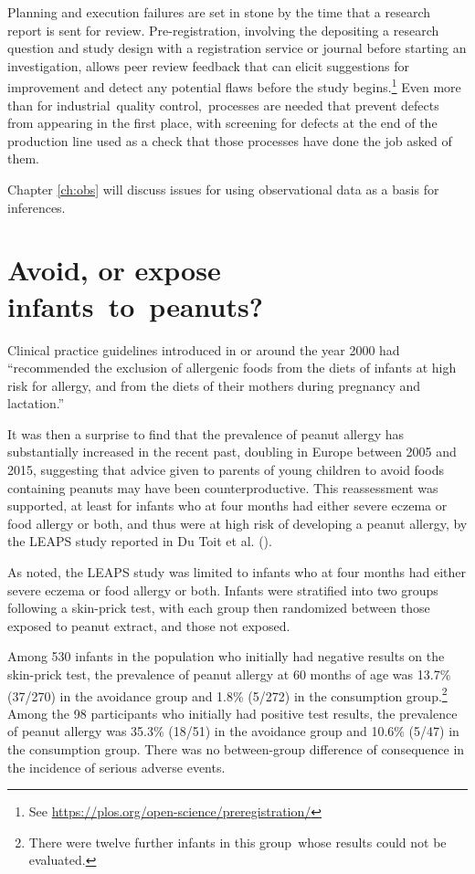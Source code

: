 \documentclass[
  10ptls,
  b5paper]{book}
\begin{document}
Planning and execution failures are set in stone by the time that a research report is sent for review. Pre-registration, involving the depositing a research question and study design with a registration service or journal before starting an investigation, allows peer review feedback that can elicit suggestions for improvement and detect any potential flaws before the study begins.\footnote{See \url{https://plos.org/open-science/preregistration/}} Even more than for industrial~quality control,~processes are needed that prevent defects from appearing in the first place, with screening for defects at the end of the production line used as a check that those processes have done the job asked of them.

Chapter \ref{ch:obs} will discuss issues for using observational data as a basis for inferences.

\section{Avoid, or expose infants~to~peanuts?}\label{avoid-or-expose-infants-to-peanuts}

Clinical practice guidelines introduced in or around the year 2000 had ``recommended the exclusion of allergenic foods from the diets of infants at high risk for allergy, and from the diets of their mothers during pregnancy and lactation.''

It was then a surprise to find that the prevalence of peanut allergy has substantially increased in the recent past, doubling in Europe between 2005 and 2015, suggesting that advice given to parents of young children to avoid foods containing peanuts may have been counterproductive. This reassessment was supported, at least for infants who at four months had either severe eczema or food allergy or both, and thus were at high risk of developing a peanut allergy, by the LEAPS study reported in Du Toit et al. ().

As noted, the LEAPS study was limited to infants who at four months had either severe eczema or food allergy or both. Infants were stratified into two groups following a skin-prick test, with each group then randomized between those exposed to peanut extract, and those not exposed.

Among 530 infants in the population who initially had negative results on the skin-prick test, the prevalence of peanut allergy at 60 months of age was 13.7\% (37/270) in the avoidance group and 1.8\% (5/272) in the consumption group.\footnote{There were twelve further infants in this group~whose results could not be evaluated.} Among the 98 participants who initially had positive test results, the prevalence of peanut allergy was 35.3\% (18/51) in the avoidance group and 10.6\% (5/47) in the consumption group. There was no between-group difference of consequence in the incidence of serious adverse events.
\end{document}
